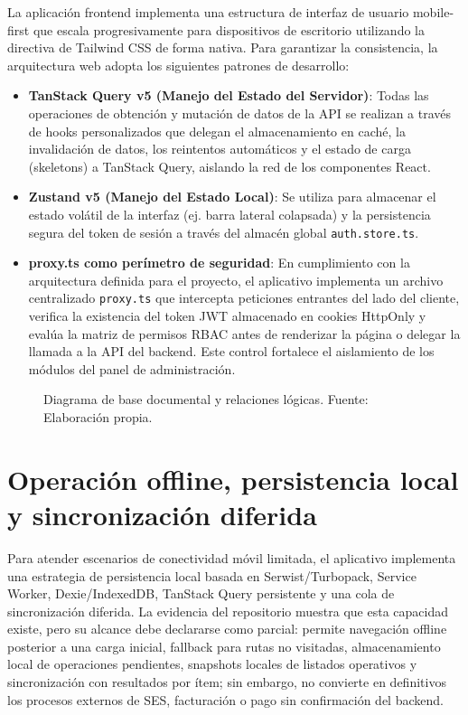 La aplicación frontend implementa una estructura de interfaz de usuario mobile-first que escala progresivamente para dispositivos de escritorio utilizando la directiva de Tailwind CSS de forma nativa. Para garantizar la consistencia, la arquitectura web adopta los siguientes patrones de desarrollo:
\begin{itemize}
    \item \textbf{TanStack Query v5 (Manejo del Estado del Servidor)}: Todas las operaciones de obtención y mutación de datos de la API se realizan a través de hooks personalizados que delegan el almacenamiento en caché, la invalidación de datos, los reintentos automáticos y el estado de carga (skeletons) a TanStack Query, aislando la red de los componentes React.
    \item \textbf{Zustand v5 (Manejo del Estado Local)}: Se utiliza para almacenar el estado volátil de la interfaz (ej. barra lateral colapsada) y la persistencia segura del token de sesión a través del almacén global \texttt{auth.store.ts}.
    \item \textbf{proxy.ts como perímetro de seguridad}: En cumplimiento con la arquitectura definida para el proyecto, el aplicativo implementa un archivo centralizado \texttt{proxy.ts} que intercepta peticiones entrantes del lado del cliente, verifica la existencia del token JWT almacenado en cookies HttpOnly y evalúa la matriz de permisos RBAC antes de renderizar la página o delegar la llamada a la API del backend. Este control fortalece el aislamiento de los módulos del panel de administración.
\end{itemize}

\begin{figure}[!htbp]
\centering
\resizebox{0.95\textwidth}{!}{%
%
}
\caption{Diagrama de base documental y relaciones lógicas. Fuente: Elaboración propia.}
\label{fig:modelo-datos}
\end{figure}

\section{Operación offline, persistencia local y sincronización diferida}

Para atender escenarios de conectividad móvil limitada, el aplicativo implementa una estrategia de persistencia local basada en Serwist/Turbopack, Service Worker, Dexie/IndexedDB, TanStack Query persistente y una cola de sincronización diferida. La evidencia del repositorio muestra que esta capacidad existe, pero su alcance debe declararse como parcial: permite navegación offline posterior a una carga inicial, fallback  para rutas no visitadas, almacenamiento local de operaciones pendientes, snapshots locales de listados operativos y sincronización con resultados por ítem; sin embargo, no convierte en definitivos los procesos externos de SES, facturación o pago sin confirmación del backend.

